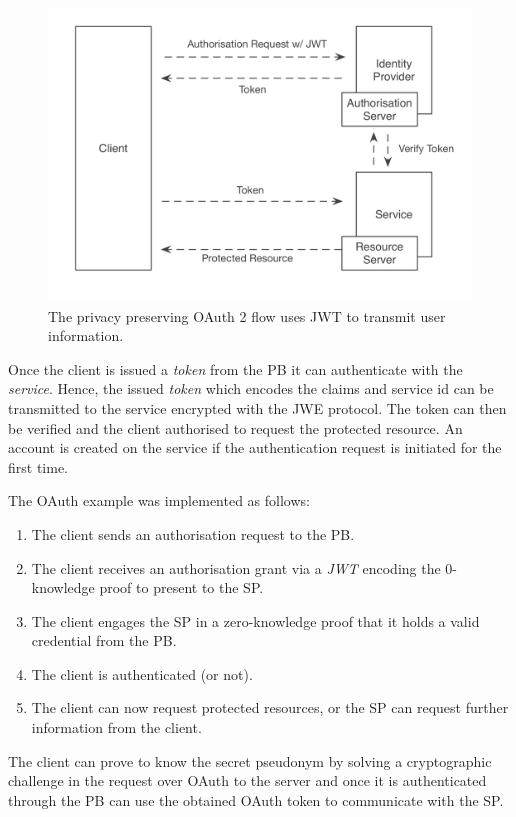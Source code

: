 \begin{figure}
\includegraphics[width=\textwidth]{figures/PrivateFlow.png}
\caption[Privacy Preserving OAuth Flow with JWT.]{The privacy preserving OAuth 2 flow uses JWT to transmit user information.
\label{fig:privateflow}}
\end{figure}

Once the client is issued a \emph{token} from the PB it can authenticate with the \emph{service}. Hence, the issued \emph{token} which encodes the claims and service id can be transmitted to the service encrypted with the JWE protocol. The token can then be verified and the client authorised to request the protected resource. An account is created on the service if the authentication request is initiated for the first time.

The OAuth example was implemented as follows:

\begin{enumerate}
    \item The client sends an authorisation request to the PB.
    \item The client receives an authorisation grant via a \emph{JWT} encoding the 0-knowledge proof to present to the SP.
    \item The client engages the SP in a zero-knowledge proof that it holds a valid credential from the PB.
    \item The client is authenticated (or not).
    \item The client can now request protected resources, or the SP can request further information from the client.
\end{enumerate}

The client can prove to know the secret pseudonym by solving a cryptographic challenge in the request over OAuth to the server and once it is authenticated through the PB can use the obtained OAuth token to communicate with the SP. 

